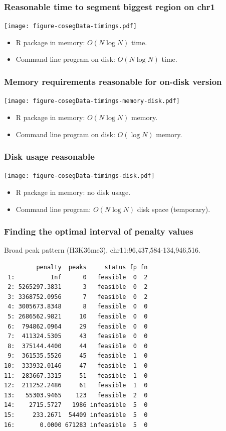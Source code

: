 \documentclass{beamer}
\begin{document}
\begin{frame}
  \frametitle{Reasonable time to segment biggest region on chr1}
  \texttt{[image: figure-cosegData-timings.pdf]}
  \begin{itemize}
  \item R package in memory: $O(N \log N)$ time.
  \item Command line program on disk: $O(N \log N)$ time.
  \end{itemize}
\end{frame}

\begin{frame}
  \frametitle{Memory requirements reasonable for on-disk version}
  \texttt{[image: figure-cosegData-timings-memory-disk.pdf]}
  \begin{itemize}
  \item R package in memory: $O(N \log N)$ memory.
  \item Command line program on disk: $O(\log N)$ memory.
  \end{itemize}
\end{frame}

\begin{frame}
  \frametitle{Disk usage reasonable}
  \texttt{[image: figure-cosegData-timings-disk.pdf]}
  \begin{itemize}
  \item R package in memory: no disk usage.
  \item Command line program: $O(N \log N)$ disk space (temporary).
  \end{itemize}
\end{frame}

\begin{frame}[fragile]
  \frametitle{Finding the optimal interval of penalty values}
\vskip 0.2cm Broad peak pattern (H3K36me3), chr11:96,437,584-134,946,516.
\scriptsize
\begin{verbatim}
         penalty  peaks     status fp fn
 1:          Inf      0   feasible  0  2
 2: 5265297.3831      3   feasible  0  2
 3: 3368752.0956      7   feasible  0  2
 4: 3005673.8348      8   feasible  0  0
 5: 2686562.9821     10   feasible  0  0
 6:  794862.0964     29   feasible  0  0
 7:  411324.5305     43   feasible  0  0
 8:  375144.4400     44   feasible  0  0
 9:  361535.5526     45   feasible  1  0
10:  333932.0146     47   feasible  1  0
11:  283667.3315     51   feasible  1  0
12:  211252.2486     61   feasible  1  0
13:   55303.9465    123   feasible  2  0
14:    2715.5727   1986 infeasible  5  0
15:     233.2671  54409 infeasible  5  0
16:       0.0000 671283 infeasible  5  0
\end{verbatim}
\end{frame}
\end{document}
